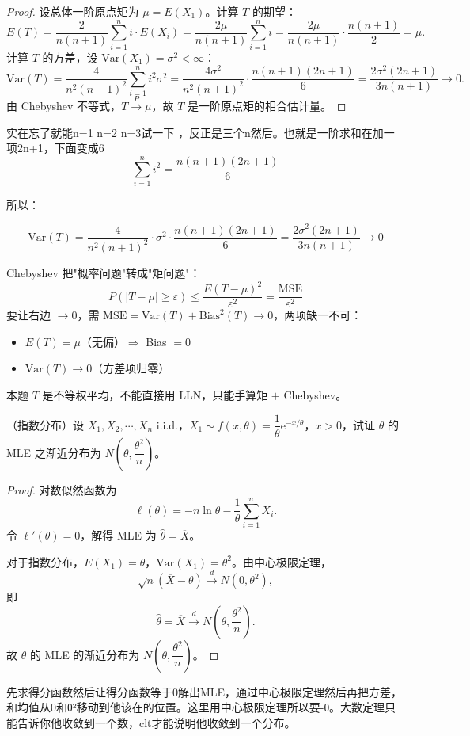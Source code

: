 \begin{proof}
设总体一阶原点矩为 $\mu = E(X_1)$。计算 $T$ 的期望：
\[
E(T) = \frac{2}{n(n+1)} \sum_{i=1}^n i \cdot E(X_i) = \frac{2\mu}{n(n+1)} \sum_{i=1}^n i = \frac{2\mu}{n(n+1)} \cdot \frac{n(n+1)}{2} = \mu.
\]
计算 $T$ 的方差，设 $\mathrm{Var}(X_1) = \sigma^2 < \infty$：
\[
\mathrm{Var}(T) = \frac{4}{n^2(n+1)^2} \sum_{i=1}^n i^2 \sigma^2 = \frac{4\sigma^2}{n^2(n+1)^2} \cdot \frac{n(n+1)(2n+1)}{6} = \frac{2\sigma^2(2n+1)}{3n(n+1)} \to 0.
\]
由 Chebyshev 不等式，$T \xrightarrow{P} \mu$，故 $T$ 是一阶原点矩的相合估计量。
\end{proof}
\begin{dxtips}[平方和]
实在忘了就能n=1 n=2 n=3试一下
，反正是三个n然后。也就是一阶求和在加一项2n+1，下面变成6
    $$\sum_{i=1}^n i^2 = \frac{n(n+1)(2n+1)}{6}$$

所以：

$$\text{Var}(T) = \frac{4}{n^2(n+1)^2} \cdot \sigma^2 \cdot \frac{n(n+1)(2n+1)}{6} = \frac{2\sigma^2(2n+1)}{3n(n+1)} \to 0$$
\end{dxtips}
\begin{dxtips}
Chebyshev 把"概率问题"转成"矩问题"：
\[
P(|T - \mu| \geq \varepsilon) \leq \frac{E(T-\mu)^2}{\varepsilon^2} = \frac{\mathrm{MSE}}{\varepsilon^2}
\]
要让右边 $\to 0$，需 $\mathrm{MSE} = \mathrm{Var}(T) + \mathrm{Bias}^2(T) \to 0$，两项缺一不可：
\begin{itemize}
  \item $E(T) = \mu$（无偏）$\Rightarrow$ Bias $= 0$
  \item $\mathrm{Var}(T) \to 0$（方差项归零）
\end{itemize}
本题 $T$ 是不等权平均，不能直接用 LLN，只能手算矩 $+$ Chebyshev。
\end{dxtips}
\begin{homework}[8]
（指数分布）设 $X_1, X_2, \cdots, X_n$ i.i.d.，$X_1 \sim f(x,\theta) = \dfrac{1}{\theta}\mathrm{e}^{-x/\theta}$，$x > 0$，试证 $\theta$ 的 MLE 之渐近分布为 $N\!\left(\theta, \dfrac{\theta^2}{n}\right)$。
\end{homework}

\begin{proof}
对数似然函数为
\[
\ell(\theta) = -n\ln\theta - \frac{1}{\theta}\sum_{i=1}^n X_i.
\]
令 $\ell'(\theta) = 0$，解得 MLE 为 $\hat{\theta} = \overline{X}$。

对于指数分布，$E(X_1) = \theta$，$\mathrm{Var}(X_1) = \theta^2$。由中心极限定理，
\[
\sqrt{n}(\overline{X} - \theta) \xrightarrow{d} N(0, \theta^2),
\]
即
\[
\hat{\theta} = \overline{X} \xrightarrow{d} N\!\left(\theta, \frac{\theta^2}{n}\right).
\]
故 $\theta$ 的 MLE 的渐近分布为 $N\!\left(\theta, \dfrac{\theta^2}{n}\right)$。
\end{proof}
\begin{dxtips}
    先求得分函数然后让得分函数等于0解出MLE，通过中心极限定理然后再把方差，和均值从0和θ²移动到他该在的位置。这里用中心极限定理所以要-θ。大数定理只能告诉你他收敛到一个数，clt才能说明他收敛到一个分布。
\end{dxtips}
